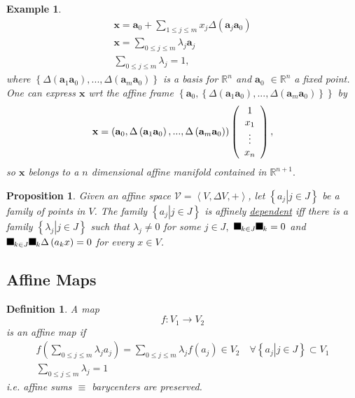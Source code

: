\documentclass[aps,preprint]{revtex4}%
\providecommand{\U}[1]{\protect\rule{.1in}{.1in}}
\newtheorem{definition}[theorem]{Definition}
\newtheorem{example}[theorem]{Example}
\newtheorem{proposition}[theorem]{Proposition}
\begin{document}
\begin{example}%
\begin{gather}
\mathbf{x}=\mathbf{a}_{0}+\sum_{1\leq j\leq m}x_{j}\Delta\left(
\mathbf{a}_{j}\mathbf{a}_{0}\right) \\
\mathbf{x}=\sum_{0\leq j\leq m}\lambda_{j}\mathbf{a}_{j}\\
\sum_{0\leq j\leq m}\lambda_{j}=1,
\end{gather}
where $\left\{  \Delta\left(  \mathbf{a}_{1}\mathbf{a}_{0}\right)
,...,\Delta\left(  \mathbf{a}_{m}\mathbf{a}_{0}\right)  \right\}  $ is a basis
for $\mathbb{R}^{n}$ and $\mathbf{a}_{0}$ $\in\mathbb{R}^{n}$ a fixed point.
One can express $\mathbf{x}$ wrt the affine frame $\left\{  \mathbf{a}%
_{0},\left\{  \Delta\left(  \mathbf{a}_{1}\mathbf{a}_{0}\right)
,...,\Delta\left(  \mathbf{a}_{m}\mathbf{a}_{0}\right)  \right\}  \right\}  $
by
\begin{equation}
\mathbf{x}=\left(  \mathbf{a}_{0},\Delta\left(  \mathbf{a}_{1}\mathbf{a}%
_{0}\right)  ,...,\Delta\left(  \mathbf{a}_{m}\mathbf{a}_{0}\right)  \right)
\left(
\begin{array}
[c]{c}%
1\\
x_{1}\\
\vdots\\
x_{n}%
\end{array}
\right)  ,
\end{equation}
so $\mathbf{x}$ belongs to a $n$ dimensional affine manifold contained in
$\mathbb{R}^{n+1}.$
\end{example}

\begin{proposition}
Given an affine space $\mathcal{V}=\left\langle V,\Delta V,+\right\rangle $,
let $\left\{  \left.  a_{j}\right\vert j\in J\right\}  $ be a family of points
in $V$. The family $\left\{  \left.  a_{j}\right\vert j\in J\right\}  $ is
\emph{affinely }\underline{\emph{dependent}} iff there is a family $\left\{
\left.  \lambda_{j}\right\vert j\in J\right\}  $ such that $\lambda_{j}\neq0$
for some $j\in J,$ $\U{2211} _{k\in J}\U{3bb} _{k}=0$ and $\U{2211} _{k\in
J}\U{3bb} _{k}\Delta\left(  a_{k}x\right)  =0$ for every $x\in V$.
\end{proposition}

\subsection{Affine Maps}

\begin{definition}
A map
\begin{equation}
f:V_{1}\rightarrow V_{2}%
\end{equation}
is an affine map if
\begin{gather}
f\left(  \sum_{0\leq j\leq m}\lambda_{j}a_{j}\right)  =\sum_{0\leq j\leq
m}\lambda_{j}f\left(  a_{j}\right)  \in V_{2}\quad\forall\left\{  \left.
a_{j}\right\vert j\in J\right\}  \subset V_{1}\\
\sum_{0\leq j\leq m}\lambda_{j}=1
\end{gather}
i.e. affine sums $\equiv$ barycenters are preserved.
\end{definition}
\end{document}
